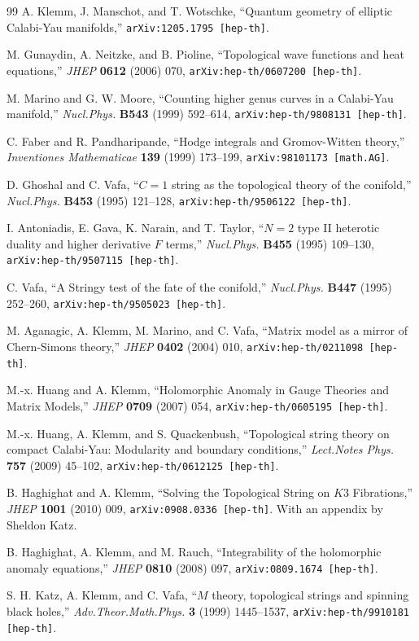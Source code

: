 \begin{thebibliography}{99}
A. Klemm, J. Manschot, and T. Wotschke, ``Quantum geometry of elliptic Calabi-Yau
manifolds,'' \texttt{arXiv:1205.1795 [hep-th]}.

M. Gunaydin, A. Neitzke, and B. Pioline, ``Topological wave functions and heat equations,''
\textit{JHEP} \textbf{0612} (2006) 070, \texttt{arXiv:hep-th/0607200 [hep-th]}.

M. Marino and G. W. Moore, ``Counting higher genus curves in a Calabi-Yau manifold,''
\textit{Nucl.Phys.} \textbf{B543} (1999) 592--614,
\texttt{arXiv:hep-th/9808131 [hep-th]}.


C. Faber and R. Pandharipande, ``Hodge integrals and Gromov-Witten theory,''
\textit{Inventiones Mathematicae} \textbf{139} (1999) 173--199,
\texttt{arXiv:98101173 [math.AG]}.

D. Ghoshal and C. Vafa, ``$C=1$ string as the topological theory of the conifold,''
\textit{Nucl.Phys.} \textbf{B453} (1995) 121--128,
\texttt{arXiv:hep-th/9506122 [hep-th]}.

I. Antoniadis, E. Gava, K. Narain, and T. Taylor, ``$N=2$ type II heterotic duality and
higher derivative $F$ terms,'' \textit{Nucl.Phys.} \textbf{B455} (1995) 109--130,
\texttt{arXiv:hep-th/9507115 [hep-th]}.

C. Vafa, ``A Stringy test of the fate of the conifold,'' \textit{Nucl.Phys.} \textbf{B447}
(1995) 252--260, \texttt{arXiv:hep-th/9505023 [hep-th]}.

M. Aganagic, A. Klemm, M. Marino, and C. Vafa, ``Matrix model as a mirror of Chern-Simons
theory,'' \textit{JHEP} \textbf{0402} (2004) 010, \texttt{arXiv:hep-th/0211098 [hep-th]}.

M.-x. Huang and A. Klemm, ``Holomorphic Anomaly in Gauge Theories and Matrix Models,''
\textit{JHEP} \textbf{0709} (2007) 054, \texttt{arXiv:hep-th/0605195 [hep-th]}.

M.-x. Huang, A. Klemm, and S. Quackenbush, ``Topological string theory on compact
Calabi-Yau: Modularity and boundary conditions,'' \textit{Lect.Notes Phys.} \textbf{757}
(2009) 45--102, \texttt{arXiv:hep-th/0612125 [hep-th]}.

B. Haghighat and A. Klemm, ``Solving the Topological String on $K3$ Fibrations,''
\textit{JHEP} \textbf{1001} (2010) 009, \texttt{arXiv:0908.0336 [hep-th]}. With an appendix
by Sheldon Katz.

B. Haghighat, A. Klemm, and M. Rauch, ``Integrability of the holomorphic anomaly
equations,'' \textit{JHEP} \textbf{0810} (2008) 097,
\texttt{arXiv:0809.1674 [hep-th]}.

S. H. Katz, A. Klemm, and C. Vafa, ``$M$ theory, topological strings and spinning black
holes,'' \textit{Adv.Theor.Math.Phys.} \textbf{3} (1999) 1445--1537,
\texttt{arXiv:hep-th/9910181 [hep-th]}.

\end{thebibliography}
\endgroup
